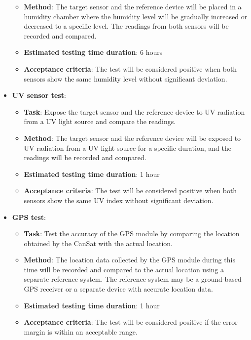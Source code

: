 \documentclass[11pt]{article}
\begin{document}
\begin{itemize}[labelwidth=0cm, leftmargin=0cm, itemindent=0.7cm, noitemsep, topsep=0pt, label={}]
\begin{itemize}[labelwidth=2cm, leftmargin=1.9cm, label=, noitemsep, topsep=2pt]
\item[\faFlask] \textbf{Method}: The target sensor and the reference device will be placed in a humidity chamber where the humidity level will be gradually increased or decreased to a specific level. The readings from both sensors will be recorded and compared.
\item[{\faHourglass[3]}] \textbf{Estimated testing time duration}:  6 hours
\item[{\faCheckSquare}] \textbf{Acceptance criteria}: The test will be considered positive when both sensors show the same humidity level without significant deviation.
\end{itemize}
\item \textbf{UV sensor test}:
\begin{itemize}[labelwidth=2cm, leftmargin=1.9cm, label=, noitemsep, topsep=2pt]
\item[\faTasks] \textbf{Task}:  Expose the target sensor and the reference device to UV radiation from a UV light source and compare the readings.
\item[\faFlask] \textbf{Method}: The target sensor and the reference device will be exposed to UV radiation from a UV light source for a specific duration, and the readings will be recorded and compared.
\item[{\faHourglass[3]}] \textbf{Estimated testing time duration}:  1 hour
\item[{\faCheckSquare}] \textbf{Acceptance criteria}: The test will be considered positive when both sensors show the same UV index without significant deviation.
\end{itemize}
\item \textbf{GPS test}:
\begin{itemize}[labelwidth=2cm, leftmargin=1.9cm, label=, noitemsep, topsep=2pt]
\item[\faTasks] \textbf{Task}:  Test the accuracy of the GPS module by comparing the location obtained by the CanSat with the actual location.
\item[\faFlask] \textbf{Method}: The location data collected by the GPS module during this time will be recorded and compared to the actual location using a separate reference system. The reference system may be a ground-based GPS receiver or a separate device with accurate location data.
\item[{\faHourglass[3]}] \textbf{Estimated testing time duration}:  1 hour
\item[{\faCheckSquare}] \textbf{Acceptance criteria}: The test will be considered positive if the error margin is within an acceptable range.
\end{itemize}
\end{itemize}
\end{document}
